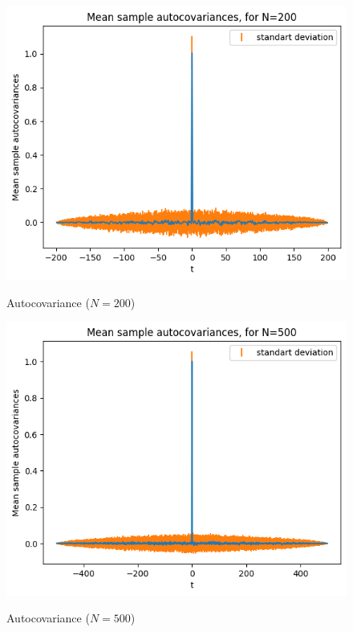 \documentclass[11pt]{article}
\begin{document}
\begin{exercise}
\begin{figure}
    \centering
    \begin{minipage}[t]{0.3\textwidth}
    \centerline{\includegraphics[width=\textwidth]{autocov200}}
    \centerline{Autocovariance ($N=200$)}
    \end{minipage}
    \begin{minipage}[t]{0.3\textwidth}
    \centerline{\includegraphics[width=\textwidth]{autocov500}}
    \centerline{Autocovariance ($N=500$)}
    \end{minipage}
    \begin{minipage}[t]{0.3\textwidth}

\end{minipage}
\end{figure}
\end{exercise}
\end{document}

